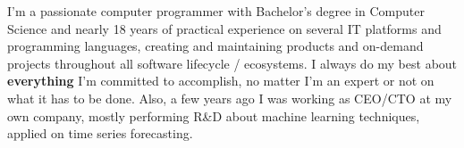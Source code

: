 
\begin{cvparagraph}
I'm a passionate computer programmer with Bachelor's degree in Computer Science and  nearly 18 years of practical experience on several IT platforms and programming languages, creating and maintaining products and on-demand projects throughout all software lifecycle / ecosystems. I always do my best about \textbf{everything} I'm committed to accomplish, no matter I'm an expert or not on what it has to be done. Also, a few years ago I was working as CEO/CTO at my own company, mostly performing  R\&D about machine learning techniques, applied on time series forecasting.
\end{cvparagraph}


